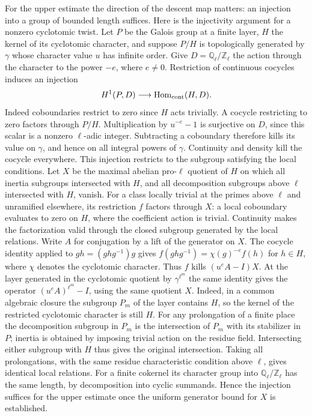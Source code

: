 \documentclass[11pt]{amsart}
\theoremstyle{definition}
\theoremstyle{remark}
\begin{document}
For the upper estimate the direction of the descent map matters:
an injection into a group of bounded length suffices. Here is the
injectivity argument for a nonzero cyclotomic twist. Let $P$ be the
Galois group at a finite layer, $H$ the kernel of its cyclotomic
character, and suppose $P/H$ is topologically generated by $\gamma$
whose character value $u$ has infinite order. Give
$D=\mathbb Q_\ell/\mathbb Z_\ell$ the action through the character
to the power $-e$, where $e\ne0$. Restriction of continuous cocycles
induces an injection
\[
 H^1(P,D)\longrightarrow \operatorname{Hom}_{\rm cont}(H,D).
\]
Indeed coboundaries restrict to zero since $H$ acts trivially. A
cocycle restricting to zero factors through $P/H$. Multiplication
by $u^{-e}-1$ is surjective on $D$, since this scalar is a nonzero
$\ell$-adic integer. Subtracting a coboundary therefore kills its
value on $\gamma$, and hence on all integral powers of $\gamma$.
Continuity and density kill the cocycle everywhere. This injection
restricts to the subgroup satisfying the local conditions. Let $X$ be the maximal abelian pro-$\ell$ quotient of $H$ on
which all inertia subgroups intersected with $H$, and all
decomposition subgroups above $\ell$ intersected with $H$, vanish.
For a class locally trivial at the primes above $\ell$ and
unramified elsewhere, its restriction $f$ factors through $X$:
a local coboundary evaluates to zero on $H$, where the coefficient
action is trivial. Continuity makes the factorization valid through
the closed subgroup generated by the local relations. Write $A$ for
conjugation by a lift of the generator on $X$. The cocycle identity
applied to $gh=(ghg^{-1})g$ gives
$f(ghg^{-1})=\chi(g)^{-e}f(h)$ for $h\in H$, where $\chi$ denotes
the cyclotomic character. Thus $f$ kills $(u^e A-I)X$. At the layer
generated in the cyclotomic quotient by $\gamma^{\ell^m}$ the
same identity gives the operator $(u^e A)^{\ell^m}-I$, using the same quotient $X$. Indeed, in a common algebraic
closure the subgroup $P_m$ of the layer contains $H$, so the kernel
of the restricted cyclotomic character is still $H$. For any
prolongation of a finite place the decomposition subgroup in $P_m$
is the intersection of $P_m$ with its stabilizer in $P$; inertia
is obtained by imposing trivial action on the residue field.
Intersecting either subgroup with $H$ thus gives the original
intersection. Taking all prolongations, with the same residue
characteristic condition above $\ell$, gives identical local relations.
For a finite cokernel its character group into
$\mathbb Q_\ell/\mathbb Z_\ell$ has the same length, by decomposition
into cyclic summands. Hence the injection suffices for the upper
estimate once the uniform generator bound for $X$ is established.
\end{document}
